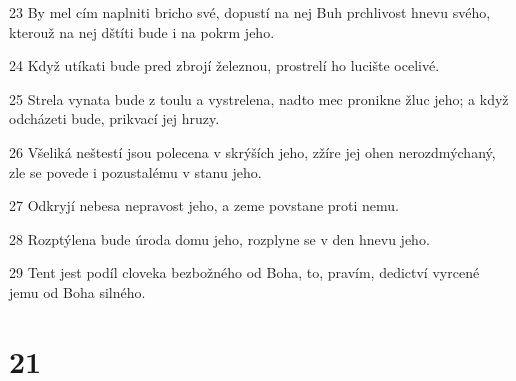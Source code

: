 \par 23 By mel cím naplniti bricho své, dopustí na nej Buh prchlivost hnevu svého, kterouž na nej dštíti bude i na pokrm jeho.
\par 24 Když utíkati bude pred zbrojí železnou, prostrelí ho lucište ocelivé.
\par 25 Strela vynata bude z toulu a vystrelena, nadto mec pronikne žluc jeho; a když odcházeti bude, prikvací jej hruzy.
\par 26 Všeliká neštestí jsou polecena v skrýších jeho, zžíre jej ohen nerozdmýchaný, zle se povede i pozustalému v stanu jeho.
\par 27 Odkryjí nebesa nepravost jeho, a zeme povstane proti nemu.
\par 28 Rozptýlena bude úroda domu jeho, rozplyne se v den hnevu jeho.
\par 29 Tent jest podíl cloveka bezbožného od Boha, to, pravím, dedictví vyrcené jemu od Boha silného.

\chapter{21}

